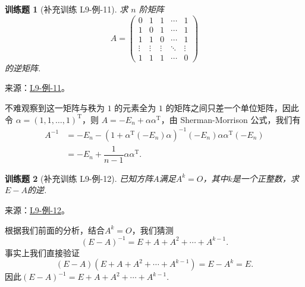 \documentclass[UTF8,12pt,a4paper,fontset=fandol]{ctexart}
\newtheorem{exercise}{训练题}[section]
\begin{document}
\begin{exercise}[补充训练 L9-例-11]\label{prob:L9-例-11}
求 $n$ 阶矩阵 
\[A = \begin{pmatrix}
        0 & 1 & 1 & \cdots & 1 \\
        1 & 0 & 1 & \cdots & 1 \\
        1 & 1 & 0 & \cdots & 1 \\
        \vdots & \vdots & \vdots & \ddots & \vdots \\
        1 & 1 & 1 & \cdots & 0
    \end{pmatrix}\]
 的逆矩阵.
\end{exercise}
\noindent 来源：\href{https://github.com/yhwu-is/Linear-Algebra-Left-Undone/blob/new/%E8%AE%B2%E4%B9%89/%E4%B8%93%E9%A2%98/9%20%E7%9F%A9%E9%98%B5%E8%BF%90%E7%AE%97%E8%BF%9B%E9%98%B6.tex}{L9-例-11}。
\begin{solve}
不难观察到这一矩阵与秩为 $1$ 的元素全为 $1$ 的矩阵之间只差一个单位矩阵，因此令 $\alpha = (1,1,\ldots,1)^\mathrm{T}$，则 $A = -E_n + \alpha\alpha^\mathrm{T}$，由 Sherman-Morrison 公式，我们有
    \begin{align*}
        A^{-1} &= -E_n - (1 + \alpha^\mathrm{T}(-E_n)\alpha)^{-1}(-E_n)\alpha\alpha^\mathrm{T}(-E_n) \\
                &= -E_n + \dfrac{1}{n-1}\alpha\alpha^\mathrm{T}.
    \end{align*}
\end{solve}

\begin{exercise}[补充训练 L9-例-12]\label{prob:L9-例-12}
已知方阵$A$满足$A^k=O$，其中$k$是一个正整数，求$E-A$的逆.
\end{exercise}
\noindent 来源：\href{https://github.com/yhwu-is/Linear-Algebra-Left-Undone/blob/new/%E8%AE%B2%E4%B9%89/%E4%B8%93%E9%A2%98/9%20%E7%9F%A9%E9%98%B5%E8%BF%90%E7%AE%97%E8%BF%9B%E9%98%B6.tex}{L9-例-12}。
\begin{solve}
根据我们前面的分析，结合$A^k=O$，我们猜测
    \[(E-A)^{-1}=E+A+A^2+\cdots+A^{k-1}.\]
    事实上我们直接验证
    \[(E-A)(E+A+A^2+\cdots+A^{k-1})=E-A^k=E.\]
    因此$(E-A)^{-1}=E+A+A^2+\cdots+A^{k-1}$.
\end{solve}
\end{document}
